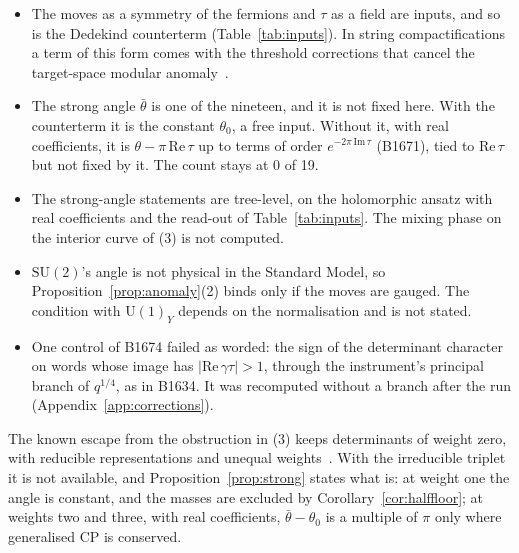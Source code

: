 \begin{itemize}
\item The moves as a symmetry of the fermions and $\tau$ as a field are inputs, and so is the Dedekind counterterm
  (Table~\ref{tab:inputs}). In string compactifications a term of this form comes with the threshold corrections that
  cancel the target-space modular anomaly~\cite{DixonKaplunovskyLouis1991,IbanezLust1992}.
\item The strong angle $\bar\theta$ is one of the nineteen, and it is not fixed here. With the counterterm it is the
  constant $\theta_0$, a free input. Without it, with real coefficients, it is $\theta-\pi\,\mathrm{Re}\,\tau$ up to
  terms of order $e^{-2\pi\,\mathrm{Im}\,\tau}$ (B1671), tied to $\mathrm{Re}\,\tau$ but not fixed by it. The count
  stays at 0 of 19.
\item The strong-angle statements are tree-level, on the holomorphic ansatz with real coefficients and the read-out of
  Table~\ref{tab:inputs}. The mixing phase on the interior curve of (3) is not computed.
\item $\mathrm{SU}(2)$'s angle is not physical in the Standard Model, so Proposition~\ref{prop:anomaly}(2) binds only if
  the moves are gauged. The condition with $\mathrm{U}(1)_Y$ depends on the normalisation and is not stated.
\item One control of B1674 failed as worded: the sign of the determinant character on words whose image has
  $|\mathrm{Re}\,\gamma\tau|>1$, through the instrument's principal branch of $q^{1/4}$, as in B1634. It was recomputed
  without a branch after the run (Appendix~\ref{app:corrections}).
\end{itemize}
The known escape from the obstruction in (3) keeps determinants of weight zero, with reducible representations and
unequal weights~\cite{FeruglioParriciatuStrumiaTitov2024,PenedoPetcov2024}. With the irreducible triplet it is not
available, and Proposition~\ref{prop:strong} states what is: at weight one the angle is constant, and the masses are
excluded by Corollary~\ref{cor:halffloor}; at weights two and three, with real coefficients, $\bar\theta-\theta_0$ is a multiple of $\pi$ only where
generalised CP is conserved.

